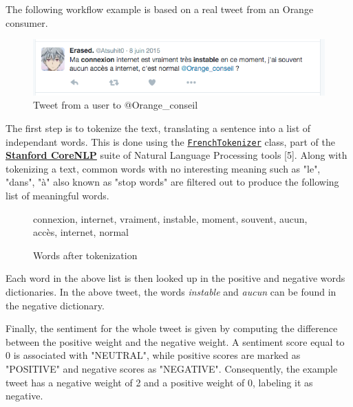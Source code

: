 \documentclass[11pt]{article}
\begin{document}
The following workflow example is based on a real tweet from an \textsf{Orange} consumer.

\begin{figure}[h!]
    \centering
    \includegraphics[scale=0.6]{img/tweet1.png}
    \caption{Tweet from a user to \textsf{@Orange\_conseil}}
    \label{tweet1}
\end{figure}

The first step is to tokenize the text, translating a sentence into a list of independant words. This is done using the  \href{https://github.com/stanfordnlp/CoreNLP/blob/master/src/edu/stanford/nlp/international/french/process/FrenchTokenizer.java}{\texttt{FrenchTokenizer}} class, part of the \href{https://stanfordnlp.github.io/CoreNLP}{\textsf{\textbf{Stanford CoreNLP}}} suite of Natural Language Processing tools [5]. Along with tokenizing a text, common words with no interesting meaning such as "le", "dans", "à" also known as "stop words" are filtered out to produce the following list of meaningful words.

\vspace{9pt}
\begin{figure}[h!]
    \centering
    \textsf{connexion, internet, vraiment, instable, moment, souvent, aucun, accès, internet, normal}
    \caption{Words after tokenization}
    \label{tokens}
\end{figure}

Each word in the above list is then looked up in the positive and negative words dictionaries. In the above tweet, the words \textit{instable} and \textit{aucun} can be found in the negative dictionary. 

Finally, the sentiment for the whole tweet is given by computing the difference between the positive weight and the negative weight. A sentiment score equal to 0 is associated with "NEUTRAL", while positive scores are marked as "POSITIVE" and negative scores as "NEGATIVE". Consequently, the example tweet has a negative weight of 2 and a positive weight of 0, labeling it as negative.
\end{document}
